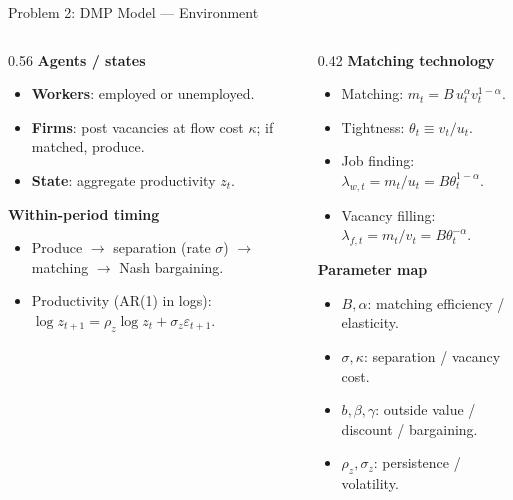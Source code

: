 \documentclass[aspectratio=169,11pt]{beamer}
\begin{document}
\begin{frame}{Problem 2: DMP Model --- Environment}
    \footnotesize
    \vspace{-0.5em}
    \begin{columns}[T]
        \begin{column}{0.56\textwidth}
            \textbf{Agents / states}
            \begin{itemize}\setlength\itemsep{0.15em}
                \item \textbf{Workers}: employed or unemployed.
                \item \textbf{Firms}: post vacancies at flow cost $\kappa$; if matched, produce.
                \item \textbf{State}: aggregate productivity $z_t$.
            \end{itemize}
            \vspace{0.15em}

            \textbf{Within-period timing}
            \begin{itemize}\setlength\itemsep{0.15em}
                \item Produce $\to$ separation (rate $\sigma$) $\to$ matching $\to$ Nash bargaining.
                \item Productivity (AR(1) in logs): $\log z_{t+1}=\rho_z\log z_t+\sigma_z\varepsilon_{t+1}$.
            \end{itemize}
        \end{column}
        \begin{column}{0.42\textwidth}
            \textbf{Matching technology}
            \begin{itemize}\setlength\itemsep{0.15em}
                \item Matching: $m_t = B\,u_t^\alpha v_t^{1-\alpha}$.
                \item Tightness: $\theta_t \equiv v_t/u_t$.
                \item Job finding: $\lambda_{w,t}=m_t/u_t=B\theta_t^{1-\alpha}$.
                \item Vacancy filling: $\lambda_{f,t}=m_t/v_t=B\theta_t^{-\alpha}$.
            \end{itemize}
            \vspace{0.15em}

            \textbf{Parameter map}
            \begin{itemize}\setlength\itemsep{0.15em}
                \item $B,\alpha$: matching efficiency / elasticity.
                \item $\sigma,\kappa$: separation / vacancy cost.
                \item $b,\beta,\gamma$: outside value / discount / bargaining.
                \item $\rho_z,\sigma_z$: persistence / volatility.
            \end{itemize}
        \end{column}
    \end{columns}
\end{frame}
\end{document}
